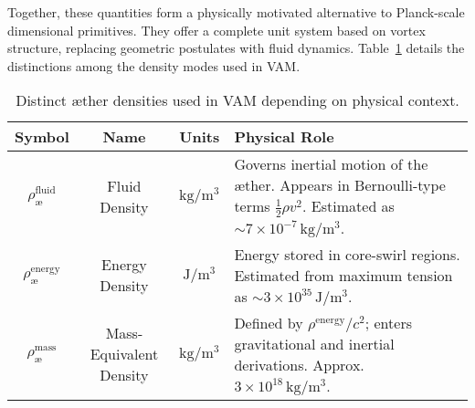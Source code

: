 \vspace{0.5em}

Together, these quantities form a physically motivated alternative to Planck-scale dimensional primitives. They offer a complete unit system based on vortex structure, replacing geometric postulates with fluid dynamics. Table~\ref{tab:ae_densities_foot} details the distinctions among the density modes used in VAM.

\begin{table}[H]
\centering
\footnotesize
\renewcommand{\arraystretch}{1.3}
\begin{tabular}{|c|c|c|p{7.5cm}|}
\hline
\textbf{Symbol} & \textbf{Name} & \textbf{Units} & \textbf{Physical Role} \\
\hline
\( \rho_\text{\ae}^{\text{fluid}} \) & Fluid Density & \( \mathrm{kg/m^3} \) & Governs inertial motion of the æther. Appears in Bernoulli-type terms \( \frac{1}{2} \rho v^2 \). Estimated as \( \sim 7 \times 10^{-7} \, \mathrm{kg/m^3} \). \\
\hline
\( \rho_\text{\ae}^{\text{energy}} \) & Energy Density & \( \mathrm{J/m^3} \) & Energy stored in core-swirl regions. Estimated from maximum tension as \( \sim 3 \times 10^{35} \, \mathrm{J/m^3} \). \\
\hline
\( \rho_\text{\ae}^{\text{mass}} \) & Mass-Equivalent Density & \( \mathrm{kg/m^3} \) & Defined by \( \rho^{\text{energy}} / c^2 \); enters gravitational and inertial derivations. Approx.\ \( 3 \times 10^{18} \, \mathrm{kg/m^3} \). \\
\hline
\end{tabular}
\caption{Distinct æther densities used in VAM depending on physical context.}
\label{tab:ae_densities_foot}
\end{table}

